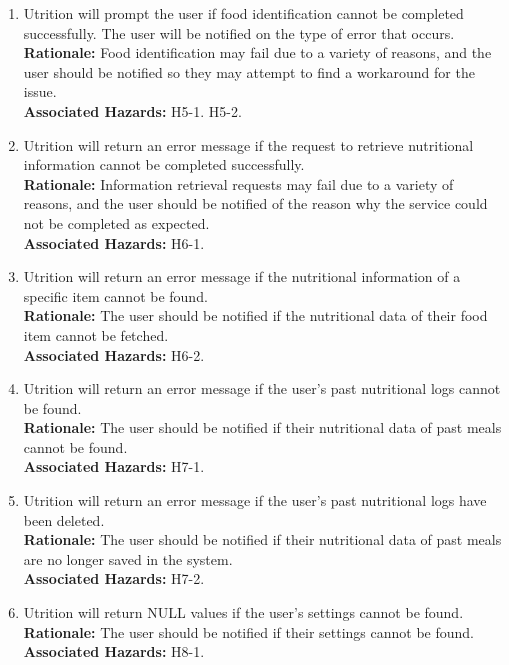 \documentclass{article}
\begin{document}
\begin{enumerate}[{SR}1.]
	\item Utrition will prompt the user if food identification cannot 
	be completed successfully. The user will be notified on the type of error 
	that occurs. \\
	\textbf{Rationale:}  Food identification may fail due to a variety of 
	reasons, and the user should be notified so they may attempt to find a  
	workaround for the issue. \\	
	\textbf{Associated Hazards:} H5-1. H5-2.
	
	\item Utrition will return an error message if the request to retrieve 
	nutritional information cannot be completed successfully. \\
	\textbf{Rationale:}  Information retrieval requests may fail due to a 
	variety of reasons, and the user should be notified of the reason why the 
	service could not be completed as expected.\\	
	\textbf{Associated Hazards:} H6-1.
	
	\item Utrition will return an error message if the nutritional information 
	of a specific item cannot be found.\\
	\textbf{Rationale:}  The user should be notified if the nutritional data of 
	their food item cannot be fetched.\\
	\textbf{Associated Hazards:} H6-2.
	
	\item Utrition will return an error message if the user's past nutritional 
	logs cannot be found.\\
	\textbf{Rationale:}  The user should be notified if their nutritional data 
	of past meals cannot be found.\\
	\textbf{Associated Hazards:} H7-1.
	
	\item Utrition will return an error message if the user's past nutritional 
	logs have been deleted.\\
	\textbf{Rationale:}  The user should be notified if their nutritional data 
	of past meals are no longer saved in the system.\\
	\textbf{Associated Hazards:} H7-2.

	\item Utrition will return NULL values if the user's settings cannot be found.\\
	\textbf{Rationale:}  The user should be notified if their settings cannot be found.\\
	\textbf{Associated Hazards:} H8-1.
	

\end{enumerate}
\end{document}
